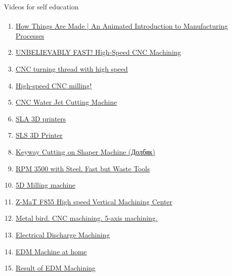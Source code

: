 \documentclass[aspectratio=169]{beamer}
\begin{document}
\begin{frame}[t]{Videos for self education}
    \framesubtitle{}
    \vspace{-0.5cm}
    \small
    \begin{multicols}{2}
        \begin{enumerate}
            \item \href{https://youtu.be/Um_g8sQ_p3Y}{How Things Are Made | An Animated Introduction to Manufacturing Processes}
            \item \href{https://www.youtube.com/watch?v=SecY2IaMtfs}{UNBELIEVABLY FAST! High-Speed CNC Machining}
            \item \href{https://www.youtube.com/shorts/AN7u5P2_PWk}{CNC turning thread with high speed}
            \item \href{https://www.youtube.com/shorts/ODOPA6p55MI}{High-speed CNC milling!}
            \item \href{https://www.youtube.com/watch?v=AWoBKAUw8hQ}{CNC Water Jet Cutting Machine}
            \item \href{https://www.youtube.com/watch?v=s94KgsbGmzc}{SLA 3D printers}
            \item \href{https://www.youtube.com/watch?v=YdmY48lizR8}{SLS 3D Printer}
            \item \href{https://www.youtube.com/watch?v=h6fQVOiwuIY}{Keyway Cutting on Shaper Machine (Долбяк)}
            \item \href{https://www.youtube.com/shorts/jdDPIU-2fQo}{RPM 3500 with Steel. Fast but Waste Tools}
            \item \href{https://www.youtube.com/watch?v=i-PgeWbDgq4}{5D Milling machine}
            \item \href{https://www.youtube.com/shorts/gGnoeD1k9ck}{Z-MaT F855 High speed Vertical Machining Center}
            \item \href{https://www.youtube.com/shorts/Hk269KvcYs4}{Metal bird. CNC machining. 5-axis machining.}
            \item \href{https://www.youtube.com/watch?v=L1D5DLWWMp8}{Electrical Discharge Machining}
            \item \href{https://www.youtube.com/watch?v=5CeCxkFVCdM}{EDM Machine at home}
            \item \href{https://www.youtube.com/shorts/SNCGf3W5otE}{Result of EDM Machining}
        \end{enumerate}
    \end{multicols}
    

\end{frame}
\end{document}
